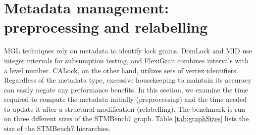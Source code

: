 




\section{Metadata management: preprocessing and relabelling} \label
{benchmark:labellingAndRelabelling}
 
MGL techniques rely on metadata to identify lock grains. DomLock and MID use integer intervals for subsumption testing, and FlexiGran combines intervals with a level number. CALock, on the other hand, utilizes sets of vertex identifiers. Regardless of the metadata type, excessive housekeeping to maintain its accuracy can easily negate any performance benefits. In this section, we examine the time required to compute the metadata initially (preprocessing) and the time needed to update it after a structural modification (relabelling). The benchmark is run on three different sizes of the STMBench7 graph. Table \ref{tab:graphSizes} lists the size of the STMBench7 hierarchies.

